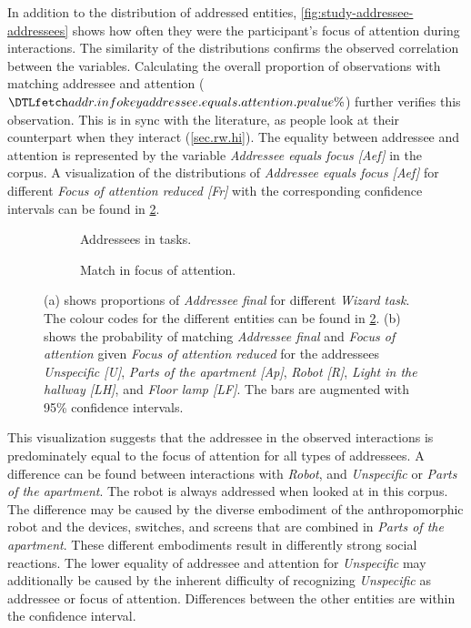 In addition to the distribution of addressed entities, \cref{fig:study-addressee-addressees} shows how often they were the participant's focus of attention during interactions.
The similarity of the distributions confirms the observed correlation between the variables.
Calculating the overall proportion of observations with matching \gls{addressee} and attention (\(\inidata{addr.info}{addressee.equals.attention.p}\%\)) further verifies this observation.
This is in sync with the literature, as people look at their counterpart when they interact (\cref{sec.rw.hi}).
The equality between \gls{addressee} and attention is represented by the variable \emph{Addressee equals focus [Aef]} in the corpus.
A visualization of the distributions of \emph{Addressee equals focus [Aef]} for different \emph{Focus of attention reduced [Fr]} with the corresponding confidence intervals can be found in \cref{fig:study-addressee-equal-foa}.
\begin{figure}[tbh]
    \centering
    \begin{subfigure}[t]{0.49\textwidth}
        
        \caption{Addressees in tasks.}
        \label{fig:study-addressees-in-tasks}
    \end{subfigure}
    \hfill
    \begin{subfigure}[t]{0.49\textwidth}
        
        \caption{Match in focus of attention.}
        \label{fig:study-addressee-equal-foa}
    \end{subfigure}
    \caption[Addressees in tasks and \emph{Aef} in \emph{Foa}.]{\label{fig:study-addressee-equal-freq} 
    (a) shows proportions of \emph{Addressee final} for different \emph{Wizard task}.
    The colour codes for the different entities can be found in \ref{fig:study-addressee-equal-foa}.
    (b) shows the probability of matching \emph{Addressee final} and \emph{Focus of attention} given \emph{Focus of attention reduced} for the \glspl{addressee} \emph{Unspecific [U]}, \emph{Parts of the apartment [Ap]}, \emph{Robot [R]}, \emph{Light in the hallway [LH]}, and \emph{Floor lamp [LF]}.
    The bars are augmented with 95\% confidence intervals.
    }
\end{figure}
This visualization suggests that the \gls{addressee} in the observed interactions is predominately equal to the focus of attention for all types of \glspl{addressee}.
A difference can be found between interactions with \emph{Robot}, and \emph{Unspecific} or \emph{Parts of the apartment}.
The \gls{robot} is always addressed when looked at in this corpus.
The difference may be caused by the diverse embodiment of the anthropomorphic \gls{robot} and the \glspl{device}, switches, and screens that are combined in \emph{Parts of the apartment}.
These different embodiments result in differently strong social reactions.
The lower equality of \gls{addressee} and attention for \emph{Unspecific} may additionally be caused by the inherent difficulty of recognizing \emph{Unspecific} as \gls{addressee} or focus of attention.
Differences between the other entities are within the confidence interval.

